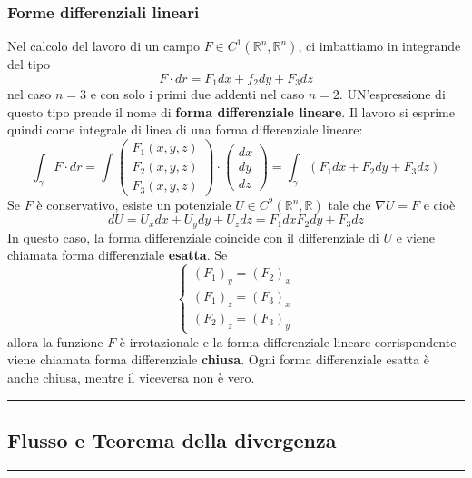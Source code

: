 \subsubsection*{Forme differenziali lineari}
Nel calcolo del lavoro di un campo $F \in C^1 (\mathbb{R}^n, \mathbb{R}^n)$, ci imbattiamo in integrande del tipo
\[
    F \cdot  dr = F_1 dx + f_2 dy + F_3 dz
\]
nel caso $n=3$ e con solo i primi due addenti nel caso $n=2$. UN'espressione di questo tipo prende il nome di \textbf{forma differenziale lineare}. Il lavoro si esprime quindi come integrale di linea di una forma differenziale lineare:
\[
    \int_\gamma F \cdot dr = \int\left(\begin{matrix}
        F_1(x,y,z)\\
        F_2(x,y,z)\\
        F_3(x,y,z)
    \end{matrix}\right) \cdot \left(\begin{matrix}
        dx\\dy\\dz
    \end{matrix}\right) = \int_\gamma (F_1 dx + F_2 dy + F_3 dz)
\] 
\newline
Se $F$ è conservativo, esiste un potenziale $U \in C^2(\mathbb{R}^n, \mathbb{R})$ tale che $\nabla U = F$ e cioè
\[
    dU = U_x dx + U_y dy + U_z dz = F_1 dx F_2 dy + F_3 dz
\]
In questo caso, la forma differenziale coincide con il differenziale di $U$ e viene chiamata forma differenziale \textbf{esatta}.\newline
\newline
Se 
\[
    \begin{cases}
        (F_1)_y =(F_2)_x\\
        (F_1)_z =(F_3)_x\\
        (F_2)_z =(F_3)_y
    \end{cases}
\]
allora la funzione $F$ è irrotazionale e la forma differenziale lineare corrispondente viene chiamata forma differenziale \textbf{chiusa}.\newline
\newline
Ogni forma differenziale esatta è anche chiusa, mentre il viceversa non è vero.\newline
\rule{\textwidth}{2pt}
\subsection*{Flusso e Teorema della divergenza}
\rule{\textwidth}{0,4pt}
